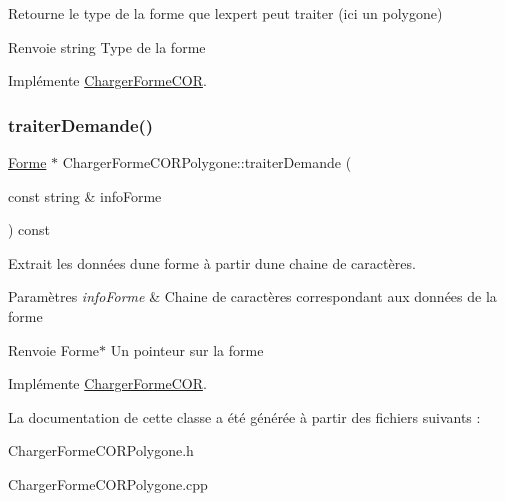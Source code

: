 Retourne le type de la forme que l\textquotesingle{}expert peut traiter (ici un polygone) 

\begin{DoxyReturn}{Renvoie}
string Type de la forme 
\end{DoxyReturn}


Implémente \mbox{\hyperlink{class_charger_forme_c_o_r_ae740eabcd9b3cc3809c1fe5ffd0100a1}{Charger\+Forme\+C\+OR}}.

\mbox{\label{class_charger_forme_c_o_r_polygone_a4ce89ecdaa400d4930743a8e7204b5f2}} 
\subsubsection{\texorpdfstring{traiterDemande()}{traiterDemande()}}
{\footnotesize\ttfamily \mbox{\hyperlink{class_forme}{Forme}} $\ast$ Charger\+Forme\+C\+O\+R\+Polygone\+::traiter\+Demande (\begin{DoxyParamCaption}\item[{const string \&}]{info\+Forme }\end{DoxyParamCaption}) const\hspace{0.3cm}{\ttfamily [virtual]}}



Extrait les données d\textquotesingle{}une forme à partir d\textquotesingle{}une chaine de caractères. 


\begin{DoxyParams}{Paramètres}
{\em info\+Forme} & Chaine de caractères correspondant aux données de la forme \\
\hline
\end{DoxyParams}
\begin{DoxyReturn}{Renvoie}
Forme$\ast$ Un pointeur sur la forme 
\end{DoxyReturn}


Implémente \mbox{\hyperlink{class_charger_forme_c_o_r_a1d9563c3a1ff9d6d86aa87a83bdaf8da}{Charger\+Forme\+C\+OR}}.



La documentation de cette classe a été générée à partir des fichiers suivants \+:\begin{DoxyCompactItemize}
\item 
Charger\+Forme\+C\+O\+R\+Polygone.\+h\item 
Charger\+Forme\+C\+O\+R\+Polygone.\+cpp\end{DoxyCompactItemize}
